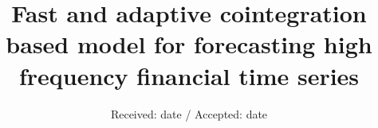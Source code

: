 \documentclass[smallextended]{svjour3}       %
\begin{document}
\title{Fast and adaptive cointegration based model
for forecasting high frequency financial time series}


\author{}


\date{Received: date / Accepted: date}


\maketitle
\end{document}
